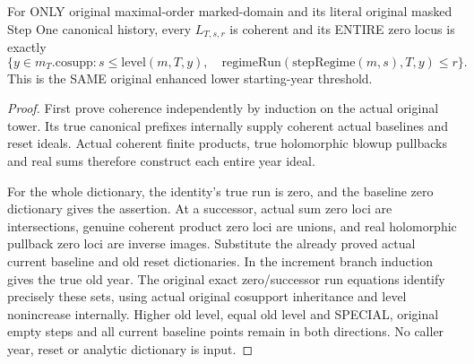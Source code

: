 \begin{theorem}
\label{hir:original-step-one-lower-history-year-coherent-zero-locus}
\leanok
{}
For ONLY original maximal-order marked-domain and its literal original masked
Step One canonical history, every $L_{T,s,r}$ is coherent and its ENTIRE zero
locus is exactly
\[
 \{y\in m_T.\mathrm{cosupp}:s\le\mathrm{level}(m,T,y),\quad
             \mathrm{regimeRun}(\mathrm{stepRegime}(m,s),T,y)\le r\}.
\]
This is the SAME original enhanced lower starting-year threshold.
\end{theorem}
\begin{proof}
First prove coherence independently by induction on the actual original tower.
Its true canonical prefixes internally supply coherent actual baselines and
reset ideals. Actual coherent finite products, true holomorphic blowup
pullbacks and real sums therefore construct each entire year ideal.

For the whole dictionary, the identity's true run is zero, and the baseline
zero dictionary gives the assertion. At a successor, actual sum zero loci are
intersections, genuine coherent product zero loci are unions, and real
holomorphic pullback zero loci are inverse images. Substitute the already
proved actual current baseline and old reset dictionaries. In the increment
branch induction gives the true old year. The original exact zero/successor
run equations identify precisely these sets, using actual original cosupport
inheritance and level nonincrease internally. Higher old level, equal old level
and SPECIAL, original empty steps and all current baseline points remain in
both directions. No caller year, reset or analytic dictionary is input.
\end{proof}

